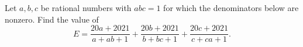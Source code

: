 Let $a,b,c$ be rational numbers with $abc=1$ for which the denominators below are nonzero. Find the value of
\[E=\dfrac{20a+2021}{a+ab+1}+\dfrac{20b+2021}{b+bc+1}+\dfrac{20c+2021}{c+ca+1}.\]
